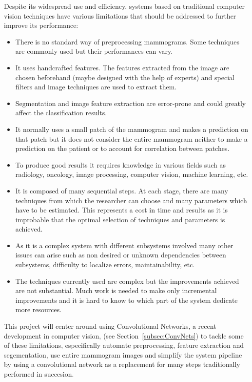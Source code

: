 Despite its widespread use and efficiency, systems based on traditional computer vision techniques have various limitations that should be addressed to further improve its performance:
\begin{itemize}
	\item There is no standard way of preprocessing mammograms. Some techniques are commonly used but their performances can vary.
	\item It uses handcrafted features. The features extracted from the image are chosen beforehand (maybe designed with the help of experts) and special filters and image techniques are used to extract them.
	\item Segmentation and image feature extraction are error-prone and could greatly affect the classification results.
	\item It normally uses a small patch of the mammogram and makes a prediction on that patch but it does not consider the entire mammogram neither to make a prediction on the patient or to account for correlation between patches.
	\item To produce good results it requires knowledge in various fields such as radiology, oncology, image processing, computer vision, machine learning, etc.
	\item It is composed of many sequential steps. At each stage, there are many techniques from which the researcher can choose and many parameters which have to be estimated. This represents a cost in time and results as it is improbable that the optimal selection of techniques and parameters is achieved.
	\item As it is a complex system with different subsystems involved many other issues can arise such as non desired or unknown dependencies between subsystems, difficulty to localize errors, maintainability, etc.  
	\item The techniques currently used are complex but the improvements achieved are not substantial. Much work is needed to make only incremental improvements and it is hard to know to which part of the system dedicate more resources.
\end{itemize}

This project will center around using Convolutional Networks, a recent development in computer vision, (see Section~\ref{subsec:ConvNets}) to tackle some of these limitations, especifically automate preprocessing, feature extraction and segementation, use entire mammogram images and simplify the system pipeline by using a convolutional network as a replacement for many steps traditionally performed in succesion.
